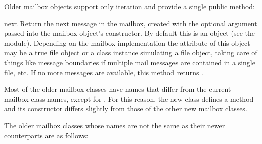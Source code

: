 Older mailbox objects support only iteration and provide a single public
method:

\begin{methoddesc}{next}{}
Return the next message in the mailbox, created with the optional 
argument passed into the mailbox object's constructor. By default this is an
 object (see the  module).  Depending
on the mailbox implementation the  attribute of this object may be a
true file object or a class instance simulating a file object, taking care of
things like message boundaries if multiple mail messages are contained in a
single file, etc.  If no more messages are available, this method returns
.
\end{methoddesc}

Most of the older mailbox classes have names that differ from the current
mailbox class names, except for . For this reason, the new
 class defines a  method and its constructor
differs slightly from those of the other new mailbox classes.

The older mailbox classes whose names are not the same as their newer
counterparts are as follows:

